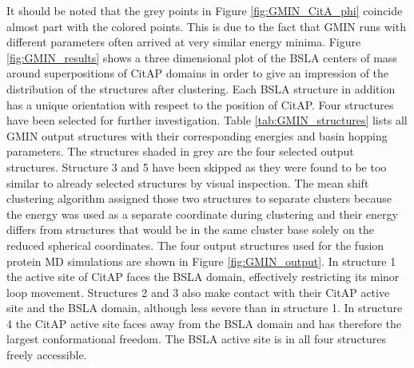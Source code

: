 \documentclass[english, a4paper, 12pt, titlepage, draft]{article}
\begin{document}
It should be noted that the grey points in Figure \ref{fig:GMIN_CitA_phi} coincide almost part with the colored points.
This is due to the fact that GMIN runs with different parameters often arrived at very similar energy minima.
Figure \ref{fig:GMIN_results} shows a three dimensional plot of the BSLA centers of mass around superpositions of CitAP domains in order to give an impression of the distribution of the structures after clustering.
Each BSLA structure in addition has a unique orientation with respect to the position of CitAP.
Four structures have been selected for further investigation.
Table \ref{tab:GMIN_structures} lists all GMIN output structures with their corresponding energies and basin hopping parameters.
The structures shaded in grey are the four selected output structures.
Structure 3 and 5 have been skipped as they were found to be too similar to already selected structures by visual inspection.
The mean shift clustering algorithm assigned those two structures to separate clusters because the energy was used as a separate coordinate during clustering and their energy differs from structures that would be in the same cluster base solely on the reduced spherical coordinates.
The four output structures used for the fusion protein MD simulations are shown in Figure \ref{fig:GMIN_output}.
In structure 1 the active site of CitAP faces the BSLA domain, effectively restricting its minor loop movement.
Structures 2 and 3 also make contact with their CitAP active site and the BSLA domain, although less severe than in structure 1.
In structure 4 the CitAP active site faces away from the BSLA domain and has therefore the largest conformational freedom.
The BSLA active site is in all four structures freely accessible.
\end{document}
